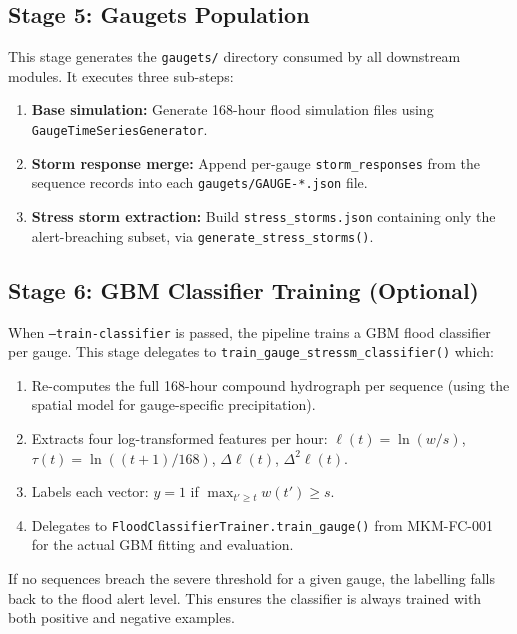 \documentclass[11pt,a4paper]{article}
\begin{document}
\subsection{Stage 5: Gaugets Population}

This stage generates the \texttt{gaugets/} directory consumed by all
downstream modules. It executes three sub-steps:

\begin{enumerate}[nosep]
    \item \textbf{Base simulation:} Generate 168-hour flood simulation files
          using \texttt{GaugeTimeSeriesGenerator}.
    \item \textbf{Storm response merge:} Append per-gauge
          \texttt{storm\_responses} from the sequence records into each
          \texttt{gaugets/GAUGE-*.json} file.
    \item \textbf{Stress storm extraction:} Build \texttt{stress\_storms.json}
          containing only the alert-breaching subset, via
          \texttt{generate\_stress\_storms()}.
\end{enumerate}

\subsection{Stage 6: GBM Classifier Training (Optional)}

When \texttt{--train-classifier} is passed, the pipeline trains a
GBM flood classifier per gauge. This stage delegates to
\texttt{train\_gauge\_stressm\_classifier()} which:

\begin{enumerate}[nosep]
    \item Re-computes the full 168-hour compound hydrograph per sequence
          (using the spatial model for gauge-specific precipitation).
    \item Extracts four log-transformed features per hour:
          $\ell(t) = \ln(w/s)$, $\tau(t) = \ln((t{+}1)/168)$,
          $\Delta\ell(t)$, $\Delta^2\ell(t)$.
    \item Labels each vector: $y=1$ if $\max_{t' \geq t} w(t') \geq s$.
    \item Delegates to \texttt{FloodClassifierTrainer.train\_gauge()} from
          MKM-FC-001 for the actual GBM fitting and evaluation.
\end{enumerate}

\noindent If no sequences breach the severe threshold for a given gauge, the
labelling falls back to the flood alert level. This ensures the classifier
is always trained with both positive and negative examples.
\end{document}
